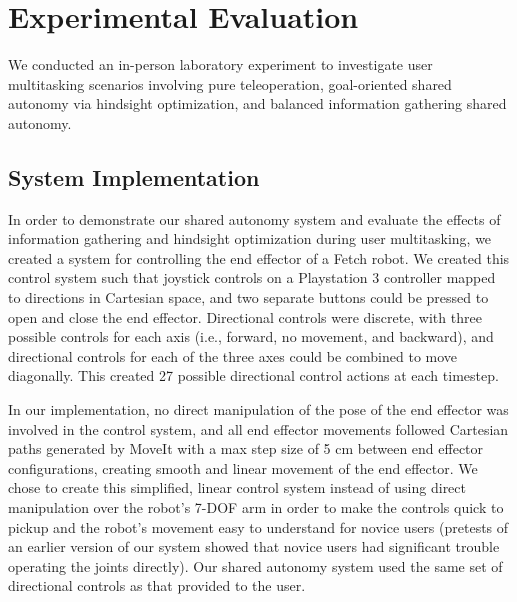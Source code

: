 \documentclass[conference]{IEEEtran}
\begin{document}
\section{Experimental Evaluation}

We conducted an in-person laboratory experiment to investigate user multitasking scenarios involving pure teleoperation, goal-oriented shared autonomy via hindsight optimization, and balanced information gathering shared autonomy.

\subsection{System Implementation}\label{implementation}
In order to demonstrate our shared autonomy system and evaluate the effects of information gathering and hindsight optimization during user multitasking, we created a system for controlling the end effector of a Fetch robot. We created this control system such that joystick controls on a Playstation 3 controller mapped to directions in Cartesian space, and two separate buttons could be pressed to open and close the end effector. Directional controls were discrete, with three possible controls for each axis (i.e., forward, no movement, and backward), and directional controls for each of the three axes could be combined to move diagonally. This created 27 possible directional control actions at each timestep.

In our implementation, no direct manipulation of the pose of the end effector was involved in the control system, and all end effector movements followed Cartesian paths generated by MoveIt \cite{sucan2013moveit} with a max step size of 5 cm between end effector configurations, creating smooth and linear movement of the end effector. We chose to create this simplified, linear control system instead of using direct manipulation over the robot's 7-DOF arm in order to make the controls quick to pickup and the robot's movement easy to understand for novice users (pretests of an earlier version of our system showed that novice users had significant trouble operating the joints directly). Our shared autonomy system used the same set of directional controls as that provided to the user.
\end{document}
